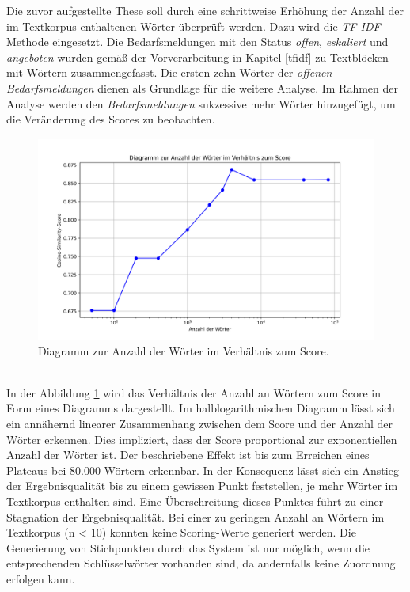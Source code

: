 Die zuvor aufgestellte These soll durch eine schrittweise Erhöhung der Anzahl der im Textkorpus enthaltenen Wörter überprüft werden. Dazu wird die \emph{TF-IDF}-Methode eingesetzt. Die Bedarfsmeldungen mit den Status \emph{offen}, \emph{eskaliert} und \emph{angeboten} wurden gemäß der Vorverarbeitung in Kapitel \ref{tfidf} zu Textblöcken mit Wörtern zusammengefasst. Die ersten zehn Wörter der \emph{offenen Bedarfsmeldungen} dienen als Grundlage für die weitere Analyse. Im Rahmen der Analyse werden den \emph{Bedarfsmeldungen} sukzessive mehr Wörter hinzugefügt, um die Veränderung des Scores zu beobachten.
\begin{figure}[H]
	\centering  
	\includegraphics[width=\linewidth]{plot/e1-woerter-score.png}
	\caption{Diagramm zur Anzahl der Wörter im Verhältnis zum Score.}
	\label{fig:woertervsscore}
\end{figure}\mbox{} \\
In der Abbildung \ref{fig:woertervsscore} wird das Verhältnis der Anzahl an Wörtern zum Score in Form eines Diagramms dargestellt. Im halblogarithmischen Diagramm lässt sich ein annähernd linearer Zusammenhang zwischen dem Score und der Anzahl der Wörter erkennen. Dies impliziert, dass der Score proportional zur exponentiellen Anzahl der Wörter ist. Der beschriebene Effekt ist bis zum Erreichen eines Plateaus bei 80.000 Wörtern erkennbar. In der Konsequenz lässt sich ein Anstieg der Ergebnisqualität bis zu einem gewissen Punkt feststellen, je mehr Wörter im Textkorpus enthalten sind. Eine Überschreitung dieses Punktes führt zu einer Stagnation der Ergebnisqualität. Bei einer zu geringen Anzahl an Wörtern im Textkorpus (n < 10) konnten keine Scoring-Werte generiert werden. Die Generierung von Stichpunkten durch das System ist nur möglich, wenn die entsprechenden Schlüsselwörter vorhanden sind, da andernfalls keine Zuordnung erfolgen kann.
